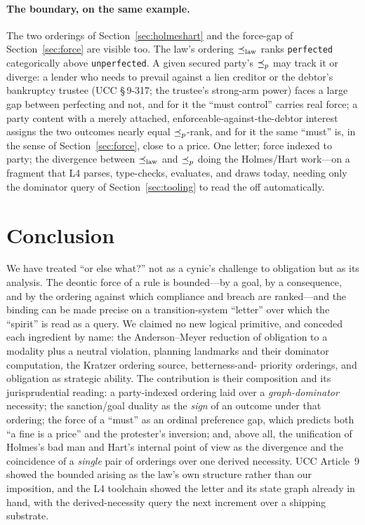 \paragraph{The boundary, on the same example.} The two orderings of
Section~\ref{sec:holmeshart} and the force-gap of Section~\ref{sec:force} are visible too.
The law's ordering $\preceq_{\mathrm{law}}$ ranks \texttt{perfected} categorically above
\texttt{unperfected}. A given secured party's $\preceq_{p}$ may track it or diverge: a lender
who needs to prevail against a lien creditor or the debtor's bankruptcy trustee (UCC
\S\,9-317; the trustee's strong-arm power) faces a large gap between perfecting and not, and
for it the ``must control'' carries real force; a party content with a merely attached,
enforceable-against-the-debtor interest assigns the two outcomes nearly equal $\preceq_{p}$-rank,
and for it the same ``must'' is, in the sense of Section~\ref{sec:force}, close to a price.
One letter; force indexed to party; the divergence between $\preceq_{\mathrm{law}}$ and $\preceq_{p}$ doing the
Holmes/Hart work---on a fragment that L4 parses, type-checks, evaluates, and draws today,
needing only the dominator query of Section~\ref{sec:tooling} to read the \MUST{} off
automatically.

\section{Conclusion}
\label{sec:conclusion}

We have treated ``or else what?'' not as a cynic's challenge to obligation but as its
analysis. The deontic force of a rule is bounded---by a goal, by a consequence, and by the
ordering against which compliance and breach are ranked---and the binding can be made
precise on a transition-system ``letter'' over which the ``spirit'' is read as a query. We
claimed no new logical primitive, and conceded each ingredient by name: the
Anderson--Meyer reduction of obligation to a modality plus a neutral violation, planning
landmarks and their dominator computation, the Kratzer ordering source, betterness-and-
priority orderings, and obligation as strategic ability. The contribution is their
composition and its jurisprudential reading: a party-indexed ordering laid over a
\emph{graph-dominator} necessity; the sanction/goal duality as the \emph{sign} of an
outcome under that ordering; the force of a ``must'' as an ordinal preference gap, which
predicts both ``a fine is a price'' and the protester's inversion; and, above all, the
unification of Holmes's bad man and Hart's internal point of view as the divergence and the
coincidence of a \emph{single} pair of orderings over one derived necessity. UCC
Article~9 showed the bounded \MUST{} arising as the law's own structure rather than our
imposition, and the L4 toolchain showed the letter and its state graph already in hand,
with the derived-necessity query the next increment over a shipping substrate.

